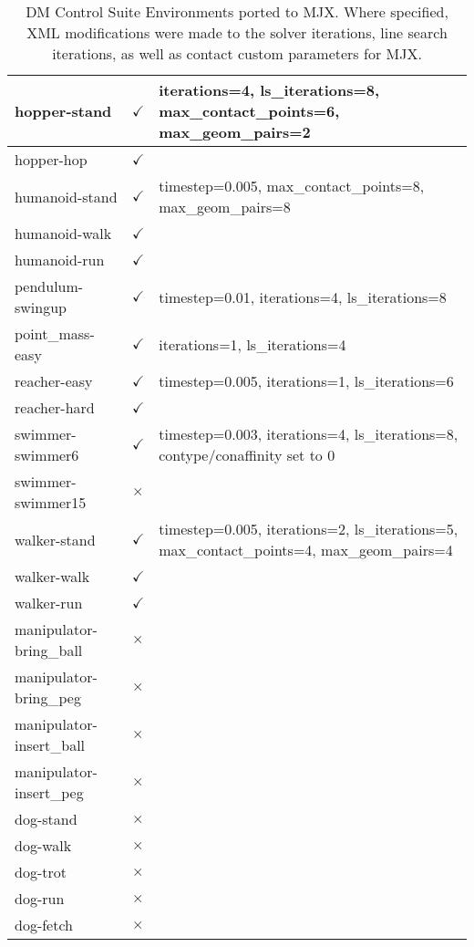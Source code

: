 \begin{table*}[!ht]
\begin{tabular}{|l|p{1.2cm}|p{10cm}|}
hopper-stand              & $\checkmark$ & iterations=4, ls\_iterations=8, max\_contact\_points=6, max\_geom\_pairs=2 \\ \hline
hopper-hop                & $\checkmark$ &  \\ \hline
humanoid-stand            & $\checkmark$ & timestep=0.005, max\_contact\_points=8, max\_geom\_pairs=8 \\ \hline
humanoid-walk             & $\checkmark$ &  \\ \hline
humanoid-run              & $\checkmark$ &  \\ \hline
pendulum-swingup          & $\checkmark$ & timestep=0.01, iterations=4, ls\_iterations=8 \\ \hline
point\_mass-easy           & $\checkmark$ & iterations=1, ls\_iterations=4 \\ \hline
reacher-easy              & $\checkmark$ & timestep=0.005, iterations=1, ls\_iterations=6 \\ \hline
reacher-hard              & $\checkmark$ &  \\ \hline
swimmer-swimmer6          & $\checkmark$ & timestep=0.003, iterations=4, ls\_iterations=8, contype/conaffinity set to 0 \\ \hline
swimmer-swimmer15         & $\times$ &  \\ \hline
walker-stand              & $\checkmark$ & timestep=0.005, iterations=2, ls\_iterations=5, max\_contact\_points=4, max\_geom\_pairs=4 \\ \hline
walker-walk               & $\checkmark$ &  \\ \hline
walker-run                & $\checkmark$ &  \\ \hline
manipulator-bring\_ball    & $\times$ & \\ \hline
manipulator-bring\_peg     & $\times$ &  \\ \hline
manipulator-insert\_ball   & $\times$ &  \\ \hline
manipulator-insert\_peg    & $\times$ &  \\ \hline
dog-stand                 & $\times$ &  \\ \hline
dog-walk                  & $\times$ &  \\ \hline
dog-trot                  & $\times$ &  \\ \hline
dog-run                   & $\times$ &  \\ \hline
dog-fetch                 & $\times$ &  \\ \hline
\hline
\end{tabular}
\caption{DM Control Suite Environments ported to MJX. Where specified, XML modifications were made to the solver iterations, line search iterations, as well as contact custom parameters for MJX.}
\label{tab:dm_control_envs}
\end{table*}

